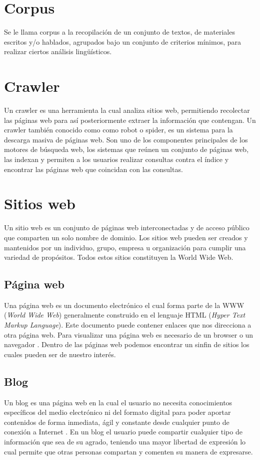 \section{Corpus}
Se le llama corpus a la recopilación de un conjunto de textos, de materiales escritos y/o hablados, 
agrupados bajo un conjunto de criterios mínimos, para realizar ciertos análisis lingüísticos.


\section{Crawler}
Un crawler \citep{CT14} es una herramienta la cual analiza sitios web, permitiendo recolectar 
las páginas web para así posteriormente extraer la información que contengan. Un crawler también 
conocido como como robot o spider, es un sistema para la descarga masiva de páginas web. Son uno de 
los componentes principales de los motores de búsqueda web, los sistemas que reúnen un conjunto de 
páginas web, las indexan y permiten a los usuarios realizar consultas contra el índice y encontrar las 
páginas web que coincidan con las consultas.


\section{Sitios web}
Un sitio web \citep{CT15} es un conjunto de páginas web interconectadas y de acceso público que comparten 
un solo nombre de dominio. Los sitios web pueden ser creados y mantenidos por un individuo, grupo, empresa 
u organización para cumplir una variedad de propósitos. Todos estos sitios constituyen la World Wide Web. 

\subsection{Página web}
Una página web es un documento electrónico el cual forma parte de la WWW (\textit{World Wide Web}) generalmente 
construido en el lenguaje HTML (\textit{Hyper Text Markup Language}). Este documento puede contener enlaces que nos 
direcciona a otra página web. Para visualizar una página web es necesario de un browser o un navegador \citep{CT16}. 
Dentro de las páginas web podemos encontrar un sinfin de sitios los cuales pueden ser de nuestro interés.

\subsection{Blog}
Un blog es una página web en la cual el usuario no necesita conocimientos específicos del medio electrónico ni del 
formato digital para poder aportar contenidos de forma inmediata, ágil y constante desde cualquier punto de conexión 
a Internet \citep{CT17}. En un blog el usuario puede compartir cualquier tipo de información que sea de su agrado, 
teniendo una mayor libertad de expresión lo cual permite que otras personas compartan y comenten su manera de expresarse.

